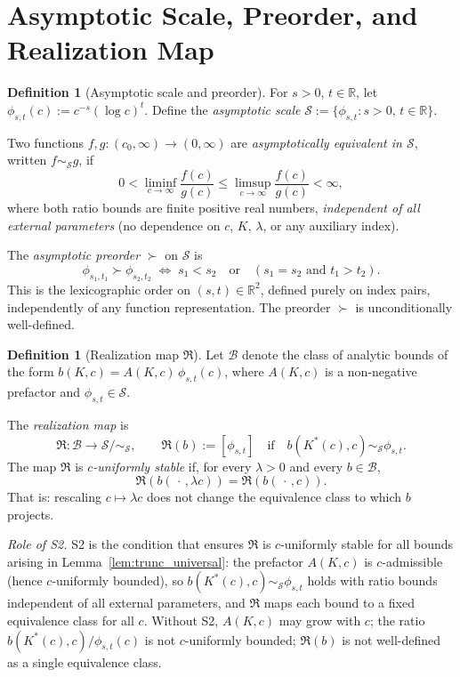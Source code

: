 \documentclass[12pt,a4paper]{amsart}
\theoremstyle{definition}
\newtheorem{definition}[theorem]{Definition}
\newcommand{\R}{\mathbb{R}}
\begin{document}
\section{Asymptotic Scale, Preorder, and Realization Map}
\label{sec:asymp}

\begin{definition}[Asymptotic scale and preorder]
\label{def:scale}
For $s>0$, $t\in\R$, let $\phi_{s,t}(c) := c^{-s}(\log c)^t$.
Define the \emph{asymptotic scale}
$\mathcal{S} := \{\phi_{s,t} : s>0,\, t\in\R\}$.

Two functions $f,g:(c_0,\infty)\to(0,\infty)$ are
\emph{asymptotically equivalent in $\mathcal{S}$},
written $f\sim_{\mathcal{S}} g$, if
\[
  0 < \liminf_{c\to\infty} \frac{f(c)}{g(c)}
  \leq \limsup_{c\to\infty} \frac{f(c)}{g(c)} < \infty,
\]
where both ratio bounds are finite positive real numbers,
\emph{independent of all external parameters}
(no dependence on $c$, $K$, $\lambda$, or any auxiliary index).

The \emph{asymptotic preorder} $\succ$ on $\mathcal{S}$ is
\[
  \phi_{s_1,t_1} \succ \phi_{s_2,t_2}
  \;\iff\;
  s_1 < s_2 \quad \text{or} \quad (s_1 = s_2 \text{ and } t_1 > t_2).
\]
This is the lexicographic order on $(s,t)\in\R^2$, defined
purely on index pairs, independently of any function representation.
The preorder $\succ$ is unconditionally well-defined.
\end{definition}

\begin{definition}[Realization map $\mathfrak{R}$]
\label{def:realization_map}
Let $\mathcal{B}$ denote the class of analytic bounds of the form
$b(K,c) = A(K,c)\,\phi_{s,t}(c)$, where $A(K,c)$ is a
non-negative prefactor and $\phi_{s,t}\in\mathcal{S}$.

The \emph{realization map} is
\[
  \mathfrak{R}\colon \mathcal{B} \to \mathcal{S}/\!\sim_{\mathcal{S}},
  \qquad
  \mathfrak{R}(b) := [\phi_{s,t}]
  \quad\text{if}\quad b(K^*(c),c) \sim_{\mathcal{S}} \phi_{s,t}.
\]
The map $\mathfrak{R}$ is \emph{$c$-uniformly stable} if,
for every $\lambda>0$ and every $b\in\mathcal{B}$,
\[
  \mathfrak{R}(b(\,\cdot\,,\lambda c)) = \mathfrak{R}(b(\,\cdot\,,c)).
\]
That is: rescaling $c\mapsto\lambda c$ does not change the
equivalence class to which $b$ projects.

\emph{Role of S2.}
S2 is the condition that ensures $\mathfrak{R}$ is $c$-uniformly
stable for all bounds arising in Lemma~\ref{lem:trunc_universal}:
the prefactor $A(K,c)$ is $c$-admissible (hence $c$-uniformly bounded),
so $b(K^*(c),c)\sim_{\mathcal{S}}\phi_{s,t}$ holds with
ratio bounds independent of all external parameters,
and $\mathfrak{R}$ maps each bound to a fixed equivalence class for all $c$.
Without S2, $A(K,c)$ may grow with $c$; the ratio
$b(K^*(c),c)/\phi_{s,t}(c)$ is not $c$-uniformly bounded;
$\mathfrak{R}(b)$ is not well-defined as a single equivalence class.
\end{definition}
\end{document}
